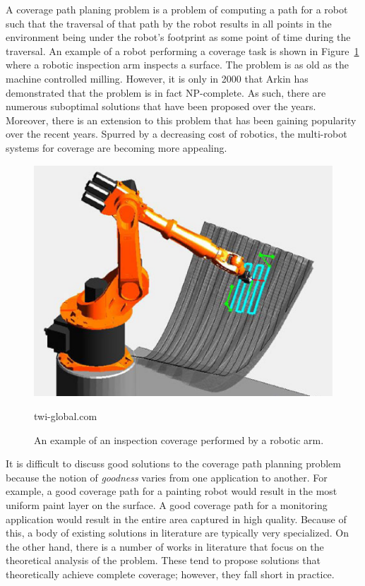 \documentclass[../main.tex]{subfiles}
\begin{document}
A coverage path planing problem is a problem of computing a path for a robot such that the traversal of that path by the robot results in all points in the environment being under the robot's footprint as some point of time during the traversal. An example of a robot performing a coverage task is shown in Figure~\ref{img:example_coverage} where a robotic inspection arm inspects a surface. The problem is as old as the machine controlled milling. However, it is only in 2000 that Arkin\cite{arkin2000approximation} has demonstrated that the problem is in fact NP-complete. As such, there are numerous suboptimal solutions that have been proposed over the years. Moreover, there is an extension to this problem that has been gaining popularity over the recent years. Spurred by a decreasing cost of robotics, the multi-robot systems for coverage are becoming more appealing.
\begin{figure}
	\centering
	\includegraphics[scale=0.5]{img/chapter_1/example_coverage.eps}
	\vskip-15pt
	\caption*{\tiny twi-global.com}
	\caption{An example of an inspection coverage performed by a robotic arm.}
	\label{img:example_coverage}
\end{figure}

It is difficult to discuss good solutions to the coverage path planning problem because the notion of \emph{goodness} varies from one application to another. For example, a good coverage path for a painting robot would result in the most uniform paint layer on the surface. A good coverage path for a monitoring application would result in the entire area captured in high quality. Because of this, a body of existing solutions in literature are typically very specialized. On the other hand, there is a number of works in literature that focus on the theoretical analysis of the problem. These tend to propose solutions that theoretically achieve complete coverage; however, they fall short in practice.
\end{document}
